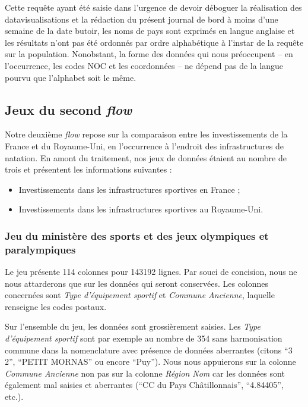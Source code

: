 \documentclass[hidelinks, 12pt]{article}
\begin{document}
Cette requête ayant été saisie dans l'urgence de devoir déboguer la réalisation des datavisualisations et la rédaction du présent journal de bord à moins d'une semaine de la date butoir, les noms de pays sont exprimés en langue anglaise et les résultats n'ont pas été ordonnés par ordre alphabétique à l'instar de la requête sur la population. Nonobstant, la forme des données qui nous préoccupent -- en l'occurrence, les codes NOC et les coordonnées -- ne dépend pas de la langue pourvu que l'alphabet soit le même.





%





\subsection{Jeux du second \emph{flow}}

Notre deuxième \emph{flow} repose sur la comparaison entre les investissements de la France et du Royaume-Uni, en l'occurrence à l'endroit des infrastructures de natation. En amont du traitement, nos jeux de données étaient au nombre de trois et présentent les informations suivantes :

\begin{itemize}
	\item Investissements dans les infrastructures sportives en France\autocite{ministere} ;
	\item Investissements dans les infrastructures sportives au Royaume-Uni\autocite{ru}.
\end{itemize}


\subsubsection{Jeu du ministère des sports et des jeux olympiques et paralympiques}

Le jeu présente 114 colonnes pour 143192 lignes. Par souci de concision, nous ne nous attarderons que sur les données qui seront conservées. Les colonnes concernées sont \emph{Type d'équipement sportif} et \emph{Commune Ancienne}, laquelle renseigne les codes postaux.

Sur l'ensemble du jeu, les données sont grossièrement saisies. Les \emph{Type d'équipement sportif} sont par exemple au nombre de 354 sans harmonisation commune dans la nomenclature avec présence de données aberrantes (citons \enquote{3 2}, \enquote{PETIT MORNAS} ou encore \enquote{Puy}). Nous nous appuierons sur la colonne \emph{Commune Ancienne} non pas sur la colonne \emph{Région Nom} car les données sont également mal saisies et aberrantes (\enquote{CC du Pays Châtillonnais}, \enquote{4.84405}, etc.).
\end{document}
